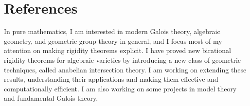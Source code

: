 \section{References}
\begin{enumerate}
\end{enumerate}
In pure mathematics, I am interested in modern Galois theory, algebraic geometry, and geometric group theory in general, and I focus most of my attention on making rigidity theorems explicit.  I have proved new birational rigidity theorems for algebraic varieties by introducing a new class of geometric techniques, called anabelian intersection theory.  I am working on extending these results, understanding their applications and making them effective and computationally efficient.  I am also working on some projects in model theory and fundamental Galois theory.


